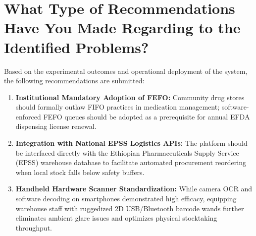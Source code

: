 \section{What Type of Recommendations Have You Made Regarding to the Identified Problems?}
Based on the experimental outcomes and operational deployment of the system, the following recommendations are submitted:
\begin{enumerate}
    \item \textbf{Institutional Mandatory Adoption of FEFO:} Community drug stores should formally outlaw FIFO practices in medication management; software-enforced FEFO queues should be adopted as a prerequisite for annual EFDA dispensing license renewal.
    \item \textbf{Integration with National EPSS Logistics APIs:} The platform should be interfaced directly with the Ethiopian Pharmaceuticals Supply Service (EPSS) warehouse database to facilitate automated procurement reordering when local stock falls below safety buffers.
    \item \textbf{Handheld Hardware Scanner Standardization:} While camera OCR and software decoding on smartphones demonstrated high efficacy, equipping warehouse staff with ruggedized 2D USB/Bluetooth barcode wands further eliminates ambient glare issues and optimizes physical stocktaking throughput.
\end{enumerate}
